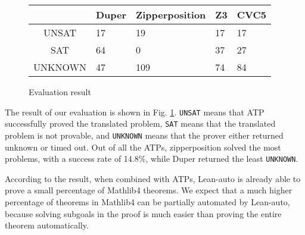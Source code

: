   \begin{figure}
  \begin{center}\begin{tabular}{| c K{6em} K{6em} K{6em} K{6em} |}
    \hline
            & Duper & Zipperposition & Z3 & CVC5 \\ \hline
    UNSAT   & 17    & 19             & 17 & 17   \\
    SAT     & 64    & 0              & 37 & 27   \\
    UNKNOWN & 47    & 109            & 74 & 84   \\ \hline
  \end{tabular}\end{center}
  \caption{Evaluation result} \label{figevalresult}
  \end{figure}

  The result of our evaluation is shown in Fig. \ref{figevalresult}. \texttt{UNSAT} means
  that ATP successfully proved the translated problem, \texttt{SAT} means that
  the translated problem is not provable, and \texttt{UNKNOWN} means that the prover
  either returned unknown or timed out. Out of all the ATPs, zipperposition solved the
  most problems, with a success rate of 14.8\%, while Duper returned the least \texttt{UNKNOWN}.
  
  According to the result, when combined with ATPs, Lean-auto is already able to
  prove a small percentage of Mathlib4 theorems. We expect that a much higher percentage
  of theorems in Mathlib4 can be partially automated by Lean-auto, because solving
  subgoals in the proof is much easier than proving the entire theorem automatically.